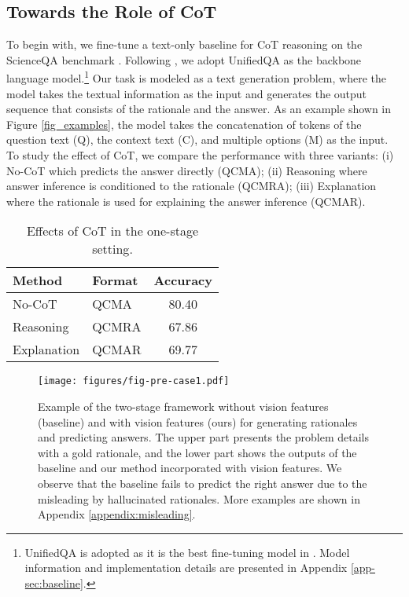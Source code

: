 \documentclass[nohyperref]{article}
\theoremstyle{plain}
\theoremstyle{definition}
\theoremstyle{remark}
\begin{document}
\subsection{Towards the Role of CoT}
To begin with, we fine-tune a text-only baseline for CoT reasoning on the ScienceQA benchmark \citep{lu2022learn}. Following \citet{lu2022learn}, we adopt UnifiedQA \citep{khashabi2020unifiedqa} as the backbone language model.\footnote{{UnifiedQA \citep{khashabi2020unifiedqa} is adopted as it is the best fine-tuning model in \citet{lu2022learn}. Model information and implementation details are presented in Appendix \ref{app-sec:baseline}.}} Our task is modeled as a text generation problem, where the model takes the textual information as the input and generates the output sequence
that consists of the rationale and the answer. As an example shown in Figure \ref{fig_examples}, the model takes the
concatenation of tokens of the question text (Q), the context text (C), and multiple options (M) as the input. To study the effect of CoT, we compare the performance with three variants: (i) No-CoT which predicts the answer directly (QCMA); (ii) Reasoning where answer inference is conditioned to the rationale (QCMRA); (iii) Explanation where the rationale is used for explaining the answer inference (QCMAR).



\begin{table}[htb]
    \centering\small
      \vspace{-3.6mm}
        \caption{Effects of CoT in {the one-stage setting}.\label{tab:pre_position}}
         \setlength{\tabcolsep}{12pt}
         {
        \begin{tabular}{llc}\toprule
         {Method} & {Format} & {Accuracy} \\\midrule
        No-CoT & QCMA   & 80.40 \\
        \midrule
        Reasoning &  QCMRA   & 67.86\\
        Explanation &  QCMAR   & 69.77\\
        \bottomrule
        \end{tabular}
        \vspace{-1.8mm}
}
\end{table}


\begin{figure*}[htb]
  \begin{center}
   \texttt{[image: figures/fig-pre-case1.pdf]}
  \end{center}
  \vspace{-3mm}
  \caption{Example of the two-stage framework without vision features (baseline) and with vision features (ours) for generating rationales and predicting answers. The upper part presents the problem details with a gold rationale, and the lower part shows the outputs of the baseline and our method incorporated with vision features. We observe that the baseline fails to predict the right answer due to the misleading by hallucinated rationales. More examples are shown in Appendix \ref{appendix:misleading}.}
    \vspace{-3mm}
  \label{fig_pre_case1}
\end{figure*}
\end{document}
